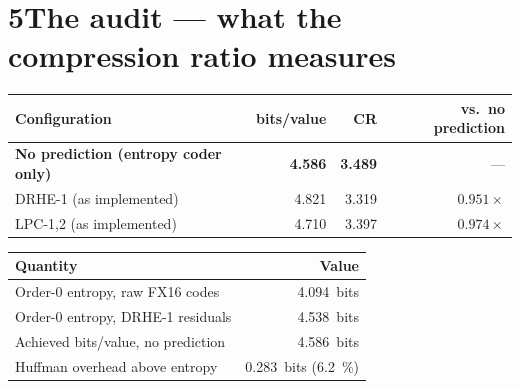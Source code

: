\documentclass[10pt,a4paper]{article}
\newcommand{\tno}[1]{\textbf{#1}}
\begin{document}
\section{5\quad The audit --- what the compression ratio measures}

\begin{center}
\begin{minipage}{0.98\textwidth}\centering
{}
\centering\small
\begin{tabular}{@{}lrrr@{}}
\toprule
Configuration & bits/value & CR & vs.\ no prediction\\
\midrule
\tno{No prediction (entropy coder only)} & \tno{4.586} & \tno{3.489} & ---\\
DRHE-1 (as implemented)                  & 4.821 & 3.319 & \textcolor{warm}{$0.951\times$}\\
LPC-1,2 (as implemented)                 & 4.710 & 3.397 & \textcolor{warm}{$0.974\times$}\\
\bottomrule
\end{tabular}
\end{minipage}
\end{center}

\begin{center}
\begin{minipage}{0.98\textwidth}\centering
{}
\centering\small
\begin{tabular}{@{}lr@{}}
\toprule
Quantity & Value\\
\midrule
Order-0 entropy, raw FX16 codes        & \SI{4.094}{bits}\\
Order-0 entropy, DRHE-1 residuals      & \textcolor{warm}{\SI{4.538}{bits}}\\
Achieved bits/value, no prediction     & \SI{4.586}{bits}\\
Huffman overhead above entropy         & \SI{0.283}{bits} (\SI{6.2}{\percent})\\
\bottomrule
\end{tabular}
\end{minipage}
\end{center}
\end{document}
